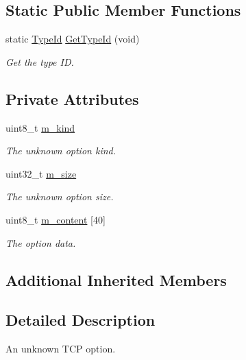 \subsection*{Static Public Member Functions}
\begin{DoxyCompactItemize}
\item 
static \hyperlink{classns3_1_1TypeId}{Type\+Id} \hyperlink{classns3_1_1TcpOptionUnknown_a5838d679281d9db4456d8152b04589cb}{Get\+Type\+Id} (void)
\begin{DoxyCompactList}\small\item\em Get the type ID. \end{DoxyCompactList}\end{DoxyCompactItemize}
\subsection*{Private Attributes}
\begin{DoxyCompactItemize}
\item 
uint8\+\_\+t \hyperlink{classns3_1_1TcpOptionUnknown_af15ae7505e75e27cae9c3f34b0cd0e4d}{m\+\_\+kind}
\begin{DoxyCompactList}\small\item\em The unknown option kind. \end{DoxyCompactList}\item 
uint32\+\_\+t \hyperlink{classns3_1_1TcpOptionUnknown_aaa1ad72446d548a9f3a6eb1ab306e7dc}{m\+\_\+size}
\begin{DoxyCompactList}\small\item\em The unknown option size. \end{DoxyCompactList}\item 
uint8\+\_\+t \hyperlink{classns3_1_1TcpOptionUnknown_a49b2d0b68ff00f9cde157668a1919dd6}{m\+\_\+content} \mbox{[}40\mbox{]}
\begin{DoxyCompactList}\small\item\em The option data. \end{DoxyCompactList}\end{DoxyCompactItemize}
\subsection*{Additional Inherited Members}


\subsection{Detailed Description}
An unknown T\+CP option. 

